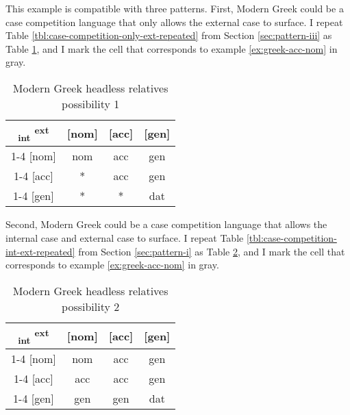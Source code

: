 This example is compatible with three patterns. First, Modern Greek could be a case competition language that only allows the external case to surface. I repeat Table \ref{tbl:case-competition-only-ext-repeated} from Section \ref{sec:pattern-iii} as Table \ref{tbl:greek-poss1}, and I mark the cell that corresponds to example \ref{ex:greek-acc-nom} in gray.

 \begin{table}[H]
   \center
   \caption{Modern Greek headless relatives possibility 1}
   \begin{tabular}{c|c|c|c}
     \toprule
     \textsubscript{\ac{int}} \textsuperscript{\ac{ext}}
            & [\ac{nom}]
            & [\ac{acc}]
            & [\ac{gen}]
            \\ \cmidrule{1-4}
        [\ac{nom}]
            & \ac{nom}
            & \cellcolor{LG}\ac{acc}
            & \ac{gen}
            \\ \cmidrule{1-4}
        [\ac{acc}]
            & *
            & \ac{acc}
            & \ac{gen}
            \\ \cmidrule{1-4}
        [\ac{gen}]
            & *
            & *
            & \ac{dat}
            \\
      \bottomrule
   \end{tabular}
     \label{tbl:greek-poss1}
 \end{table}

Second, Modern Greek could be a case competition language that allows the internal case and external case to surface. I repeat Table \ref{tbl:case-competition-int-ext-repeated} from Section \ref{sec:pattern-i} as Table \ref{tbl:greek-poss2}, and I mark the cell that corresponds to example \ref{ex:greek-acc-nom} in gray.

  \begin{table}[H]
    \center
    \caption{Modern Greek headless relatives possibility 2}
    \begin{tabular}{c|c|c|c}
      \toprule
      \textsubscript{\ac{int}} \textsuperscript{\ac{ext}}
             & [\ac{nom}]
             & [\ac{acc}]
             & [\ac{gen}]
             \\ \cmidrule{1-4}
         [\ac{nom}]
             & \ac{nom}
             & \cellcolor{LG}\ac{acc}
             & \ac{gen}
             \\ \cmidrule{1-4}
         [\ac{acc}]
             & \ac{acc}
             & \ac{acc}
             & \ac{gen}
             \\ \cmidrule{1-4}
         [\ac{gen}]
             & \ac{gen}
             & \ac{gen}
             & \ac{dat}
             \\
       \bottomrule
    \end{tabular}
      \label{tbl:greek-poss2}
  \end{table}

